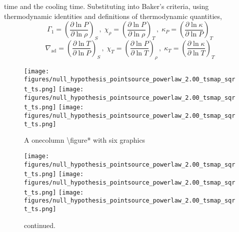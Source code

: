 \documentclass{aa}
\begin{document}
   time and the cooling time. Substituting into Baker's criteria, using
   thermodynamic identities and definitions of thermodynamic quantities,
   \begin{displaymath}
      \Gamma_1      = \left( \frac{ \partial \ln P}{ \partial\ln \rho}
                           \right)_{S}    \, , \;
      \chi^{}_\rho  = \left( \frac{ \partial \ln P}{ \partial\ln \rho}
                           \right)_{T}    \, , \;
      \kappa^{}_{P} = \left( \frac{ \partial \ln \kappa}{ \partial\ln P}
                           \right)_{T}
   \end{displaymath}
   \begin{displaymath}
      \nabla_{\mathrm{ad}} = \left( \frac{ \partial \ln T}
                              { \partial\ln P} \right)_{S} \, , \;
      \chi^{}_T       = \left( \frac{ \partial \ln P}
                              { \partial\ln T} \right)_{\rho} \, , \;
      \kappa^{}_{T}   = \left( \frac{ \partial \ln \kappa}
                              { \partial\ln T} \right)_{T}
   \end{displaymath}



   \begin{figure*}
         \centering
         \texttt{[image: figures/null\_hypothesis\_pointsource\_powerlaw\_2.00\_tsmap\_sqrt\_ts.png]}
         \texttt{[image: figures/null\_hypothesis\_pointsource\_powerlaw\_2.00\_tsmap\_sqrt\_ts.png]}
         \texttt{[image: figures/null\_hypothesis\_pointsource\_powerlaw\_2.00\_tsmap\_sqrt\_ts.png]}
         {\caption{A onecolumn \textbackslash figure* with six graphics}}
         \ContinuedFloat %
         \texttt{[image: figures/null\_hypothesis\_pointsource\_powerlaw\_2.00\_tsmap\_sqrt\_ts.png]}
         \texttt{[image: figures/null\_hypothesis\_pointsource\_powerlaw\_2.00\_tsmap\_sqrt\_ts.png]}
         \texttt{[image: figures/null\_hypothesis\_pointsource\_powerlaw\_2.00\_tsmap\_sqrt\_ts.png]}
         \caption{continued.}
         \label{FigGam}%
   \end{figure*}



\end{document}
